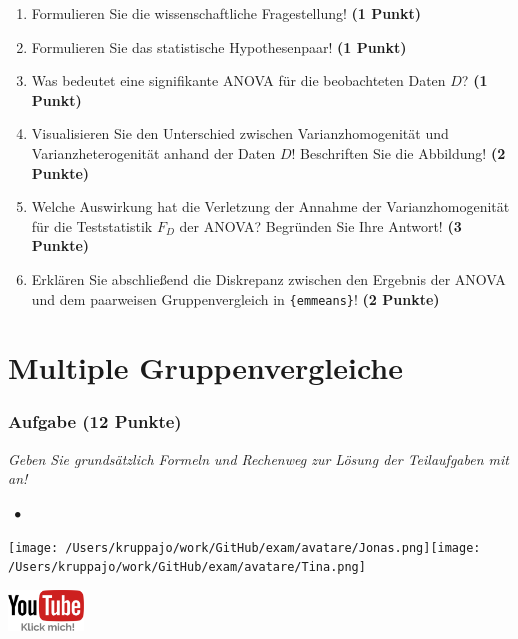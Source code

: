 \documentclass[a4paper, 9pt]{scrartcl}\usepackage[]{graphicx}\usepackage[]{xcolor}
\begin{document}
\begin{enumerate}
\item Formulieren Sie die wissenschaftliche Fragestellung! \textbf{(1 Punkt)}
\item Formulieren Sie das statistische Hypothesenpaar! \textbf{(1 Punkt)}
\item Was bedeutet eine signifikante ANOVA für die beobachteten Daten $D$? \textbf{(1 Punkt)}
\item Visualisieren Sie den Unterschied zwischen Varianzhomogenität und Varianzheterogenität anhand der Daten $D$! Beschriften Sie die Abbildung! \textbf{(2 Punkte)} 
\item Welche Auswirkung hat die Verletzung der Annahme der Varianzhomogenität für die Teststatistik $F_D$ der ANOVA? Begründen Sie Ihre Antwort! \textbf{(3 Punkte)}
\item Erklären Sie abschließend die Diskrepanz zwischen den Ergebnis der ANOVA und dem paarweisen Gruppenvergleich in \texttt{\{emmeans\}}! \textbf{(2 Punkte)}
\end{enumerate}

 
\clearpage
\part{Multiple Gruppenvergleiche}

\section{Aufgabe \hfill (12 Punkte)}

\textit{Geben Sie grundsätzlich Formeln und Rechenweg zur Lösung der Teilaufgaben mit an!} \\[1Ex]
 

 
\ifcollection
\begin{flushright}
\tiny\vspace{-3Ex}
\textbf{\examinhaltstart}
\exammodulestatversuch $\;\bullet$
\exammodulebiostat
\vspace{-4Ex}
\end{flushright}
\begin{minipage}[t]{0.5\textwidth}
\texttt{[image: /Users/kruppajo/work/GitHub/exam/avatare/Jonas.png]}\hspace{-4mm}\texttt{[image: /Users/kruppajo/work/GitHub/exam/avatare/Tina.png]}
\end{minipage}
\begin{minipage}[t]{0.5\textwidth}
\hfill
\href{https://youtu.be/uXwlbuHOj7Y}{\includegraphics[width = 2cm]{img/youtube}}
\end{minipage}
\fi
\end{document}
